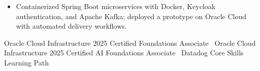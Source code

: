 \begin{itemize}
\item Containerized Spring Boot microservices with Docker, Keycloak authentication, and Apache Kafka; deployed a prototype on Oracle Cloud with automated delivery workflows.
\end{itemize}

Oracle Cloud Infrastructure 2025 Certified Foundations Associate \textbar\ Oracle Cloud Infrastructure 2025 Certified AI Foundations Associate \textbar\ Datadog Core Skills Learning Path

